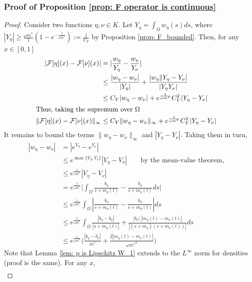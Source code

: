 \documentclass[10pt]{article}
\begin{document}
\subsubsection*{Proof of Proposition \ref{prop: F operator is continuous}}
\begin{proof}
    Consider two functions $\eta, \nu \in K$. Let $Y_\eta = \int_{\Omega}w_{\eta}(s)ds$, where $|Y_\eta| \geq \frac{\omega m^*}{1}(1-e^{-\frac{1}{\omega m^*}}):= \frac{1}{C_Y}$ by Proposition \ref{prop: F_bounded}. Then, for any $x \in [0,1]$
    \begin{align*}
        |\mathcal{F}[\eta](x) - \mathcal{F}[\nu](x)| &= |\frac{w_{\eta}}{Y_\eta}-\frac{w_{\nu}}{Y_\nu}|\\
        &\leq \frac{|w_{\eta}-w_{\nu}|}{|Y_\eta|} + \frac{|w_{\eta}\|Y_\eta-Y_\nu|}{|Y_\eta Y_\nu|}\\
        &\leq C_Y|w_{\eta}-w_{\nu}| + e^{\frac{1}{\omega m^*}} C_Y^2|Y_\eta-Y_\nu|\\
        \intertext{Thus, taking the supremum over $\Omega$}
        \|\mathcal{F}[\eta](x) - \mathcal{F}[\nu](x)\|_\infty &\leq C_Y\|w_{\eta}-w_{\nu}\|_\infty + e^{\frac{1}{\omega m^*}}C_Y^2|Y_\eta-Y_\nu|
    \end{align*}
It remains to bound the terms $\|w_\eta-w_\nu\|_\infty$ and $|Y_\eta -Y_\nu|$. Taking them in turn,
\begin{align*}
    |w_{\eta}-w_{\nu}| &= |e^{V_\eta}-e^{V_\nu}|\\
    &\leq e^{\max{\{V_\eta,V_\nu\}}}|V_\eta -V_\nu| \qquad\text{by the mean-value theorem,}\\
    &\leq e^{\frac{1}{\omega m^*}}|V_\eta -V_\nu| \\
    &= e^{\frac{1}{\omega m^*}} \Big|\int_{\Omega}\frac{b_\eta}{s+m_{\eta}(t)} - \frac{b_\eta}{s+m_{\eta}(t)}ds\Big|\\
    &\leq e^{\frac{1}{\omega m^*}} \int_{\Omega}|\frac{b_\eta}{s+m_{\eta}(t)} - \frac{b_\eta}{s+m_{\eta}(t)}|ds\\
    &\leq e^{\frac{1}{\omega m^*}}\int_\Omega \frac{|b_\eta-b_\nu|}{|s+m_{\eta}(t)|} + \frac{|b_\nu|\;|m_{\eta}(t)-m_{\nu}(t)|}{|(s+m_{\eta})(s+m_{\nu}(t))|}ds\\
    &\leq e^{\frac{1}{\omega m^*}} \Big(\frac{|b_\eta-b_\nu|}{m^*} +\frac{2|m_{\eta}(t)-m_{\nu}(t)|}{{\omega m^*}^2}\Big)
\end{align*}
Note that Lemma \ref{lem: p is Lipschitz W_1} extends to the $L^\infty$ norm for densities (proof is the same). For any $x$,
\begin{align*}

\end{align*}
\end{proof}
\end{document}
